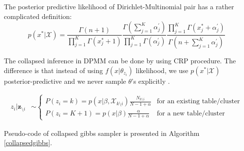 \documentclass[12pt, a4paper]{article}
\begin{document}
The posterior predictive likelihood of Dirichlet-Multinomial pair has a rather complicated definition:
\begin{equation*}
     p(x^*|\mathcal{X}) = \frac{\Gamma(n+1)}{\prod_{j=1}^{K}\Gamma(x^*_j+1)} \frac{\Gamma(\sum_{j=1}^{K}\alpha^\prime_j)}{\prod_{j=1}^{K}\Gamma(\alpha^\prime_j)} 
     \frac{\prod_{j=1}^{K}\Gamma(x^*_j+\alpha^\prime_j)}{\Gamma(n+\sum_{j=1}^{K}\alpha^\prime_j)}
\end{equation*}

The collapsed inference in DPMM can be done by using CRP
procedure. The difference is that instead of using \(f(x|\theta_{z_i})\)
likelihood, we use  $p(x^*|\mathcal{X})$ 
posterior-predictive and we never sample \(\theta\)'s
explicitly \cite{kamper2013gibbs}.

\begin{align*}
z_i|\boldsymbol z_{\setminus i}  &\sim \begin{cases}
P(z_i=k)=p(x|\beta,\mathcal{X}_{k \setminus i})\frac{N_{k\setminus i}}{N-1+\alpha} & \text{for an existing table/cluster} \\
P(z_i=K+1)=p(x|\beta)\frac{\alpha}{N-1+\alpha} & \text{for a new table/cluster}
\end{cases}
\end{align*}

Pseudo-code \cite{kamper2013gibbs} of collapsed gibbs sampler is presented in Algorithm \ref{collapsedgibbs}.
\end{document}
